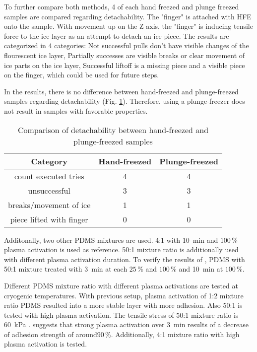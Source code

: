 To further compare both methods, 4 of each hand freezed and plunge freezed samples are compared regarding detachability. The "finger" is attached with HFE onto the sample. With movement up on the Z axis, the "finger" is inducing tensile force to the ice layer as an attempt to detach an ice piece. The results are categorized in 4 categories: Not successful pulls don't have visible changes of the flourescent ice layer, Partially successes are visible breaks or clear movement of ice parts on the ice layer, Successful liftoff is a missing piece and a visible piece on the finger, which could be used for future steps.

In the results, there is no difference between hand-freezed and plunge-freezed samples regarding detachability (Fig. \ref{table:AttemptsHandsvsMachine}). Therefore, using a plunge-freezer does not result in samples with favorable properties.

\begin{table}
	\centering
	\begin{tabular}{|c|c|c|}
		\hline
		Category & Hand-freezed & Plunge-freezed \\
		\hline
		\hline
		count executed tries & 4 & 4\\
		\hline
		unsuccessful & 3 & 3\\
		\hline
		breaks/movement of ice & 1 & 1\\
		\hline
		piece lifted with finger & 0 & 0\\
		\hline		
	\end{tabular}
	\caption{Comparison of detachability between hand-freezed and plunge-freezed samples}
	\label{table:AttemptsHandsvsMachine}
\end{table}

Additonally, two other PDMS mixtures are used. 4:1 with \SI{10}{\minute} and $100\,\%$ plasma activation is used as reference. 50:1 mixture ratio is additionally used with different plasma activation duration. To verify the results of \cite{Ohishi.2017}, PDMS with 50:1 mixture treated with \SI{3}{\minute} at each $25\,\%$ and $100\,\%$ and \SI{10}{\minute} at $100\,\%$. 

Different PDMS mixture ratio with different plasma activations are tested at cryogenic temperatures. With previous setup, plasma activation of 1:2 mixture ratio PDMS resulted into a more stable layer with more adhesion. Also 50:1 is tested with high plasma activation. The tensile stress of 50:1 mixture ratio is \SI{60}{\kilo\pascal} \cite{IbanezIbanez.2022}.  \cite{Ohishi.2017} suggests that strong plasma activation over \SI{3}{\minute} results of a decrease of adhesion strength of around$90\,\%$. Additionally, 4:1 mixture ratio with high plasma activation is tested.

